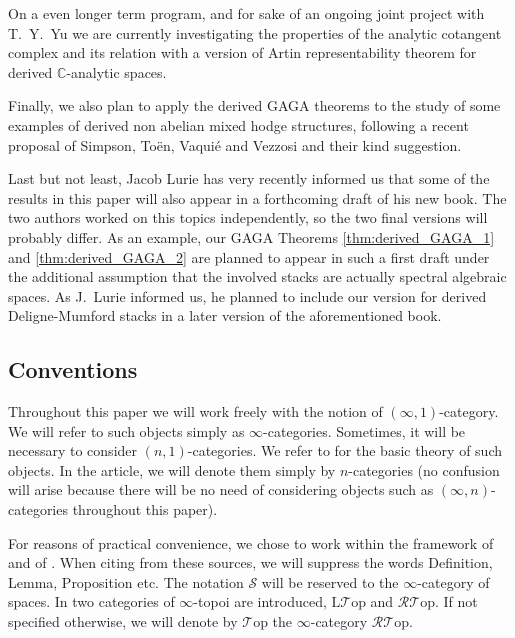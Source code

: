 \documentclass[12pt,a4paper,reqno]{amsart}
\theoremstyle{plain}
\theoremstyle{definition}
\theoremstyle{remark}
\numberwithin{equation}{section}
\begin{document}
On a even longer term program, and for sake of an ongoing joint project with T.\ Y.\ Yu we are currently investigating the properties of the analytic cotangent complex and its relation with a version of Artin representability theorem for derived {$\mathbb C$-analytic\xspace} spaces.

Finally, we also plan to apply the derived GAGA theorems to the study of some examples of derived non abelian mixed hodge structures, following a recent proposal of Simpson, To\"en, Vaqui\'e and Vezzosi and their kind suggestion.

Last but not least, Jacob Lurie has very recently informed us that some of the results in this paper will also appear in a forthcoming draft of his new book. The two authors worked on this topics independently, so the two final versions will probably differ. As an example, our GAGA Theorems \ref{thm:derived_GAGA_1} and \ref{thm:derived_GAGA_2} are planned to appear in such a first draft under the additional assumption that the involved stacks are actually spectral algebraic spaces. As J.\ Lurie informed us, he planned to include our version for derived {Deligne-Mumford\xspace} stacks in a later version of the aforementioned book.

\subsection*{Conventions}

Throughout this paper we will work freely with the notion of $(\infty,1)$-category.
We will refer to such objects simply as $\infty$-categories.
Sometimes, it will be necessary to consider $(n,1)$-categories. We refer to \cite[Â§2.3.4]{HTT} for the basic theory of such objects.
In the article, we will denote them simply by $n$-categories (no confusion will arise because there will be no need of considering objects such as $(\infty,n)$-categories throughout this paper).

For reasons of practical convenience, we chose to work within the framework of \cite{HTT} and of \cite{Lurie_Higher_algebra}.
When citing from these sources, we will suppress the words Definition, Lemma, Proposition etc.
The notation ${\mathcal S}$ will be reserved to the $\infty$-category of spaces.
In \cite[6.3.1.5]{HTT} two categories of $\infty$-topoi are introduced, ${\mathrm{L} \mathcal{T} \mathrm{op}}$ and ${\mathcal{RT} \mathrm{op}}$.
If not specified otherwise, we will denote by ${\mathcal T\mathrm{op}}$ the $\infty$-category ${\mathcal{RT} \mathrm{op}}$.
\end{document}
